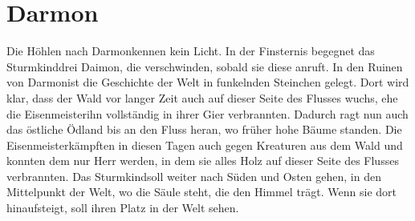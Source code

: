 \documentclass[12pt,a4paper,onecolumn,twoside,ngerman]{book}
\newcommand{\Sturmkind}{Sturmkind}
\newcommand{\Daimon}{Daimon}
\newcommand{\Darmon}{Darmon}
\newcommand{\Eisenmeister}{Eisenmeister}
\begin{document}
\section{\Darmon}
Die Höhlen nach \Darmon kennen kein Licht. In der Finsternis begegnet das \Sturmkind drei \Daimon, die verschwinden, sobald sie diese anruft.
In den Ruinen von \Darmon ist die Geschichte der Welt in funkelnden Steinchen gelegt. Dort wird klar, dass der Wald vor langer Zeit auch auf dieser Seite des Flusses wuchs, ehe die \Eisenmeister ihn vollständig in ihrer Gier verbrannten. Dadurch ragt nun auch das östliche Ödland bis an den Fluss heran, wo früher hohe Bäume standen. Die \Eisenmeister kämpften in diesen Tagen auch gegen Kreaturen aus dem Wald und konnten dem nur Herr werden, in dem sie alles Holz auf dieser Seite des Flusses verbrannten. Das \Sturmkind soll weiter nach Süden und Osten gehen, in den Mittelpunkt der Welt, wo die Säule steht, die den Himmel trägt. Wenn sie dort hinaufsteigt, soll ihren Platz in der Welt sehen.
\end{document}
